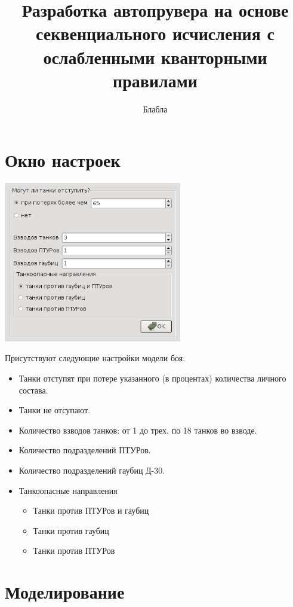 \documentclass{cw1}
\begin{document}
\sloppy

\title{Разработка автопрувера на основе секвенциального исчисления с
ослабленными кванторными правилами}

\author{Блабла}

\maketitle
\setcounter{page}{2}

\section{Окно настроек}
\begin{center}
\includegraphics[height=70mm]{img1.png}
\end{center}
Присутствуют следующие настройки модели боя.
\begin{itemize}
 \item Танки отступят при потере указанного (в процентах) количества личного состава.
 \item Танки не отсупают.
 \item Количество взводов танков: от 1 до трех, по 18 танков во взводе.
 \item Количество подразделений ПТУРов.
 \item Количество подразделений гаубиц Д-30.
 \item Танкоопасные направления
   \begin{itemize}
    \item Танки против ПТУРов и гаубиц
    \item Танки против гаубиц
    \item Танки против ПТУРов
   \end{itemize}
\end{itemize}


\section{Моделирование}
\end{document}
